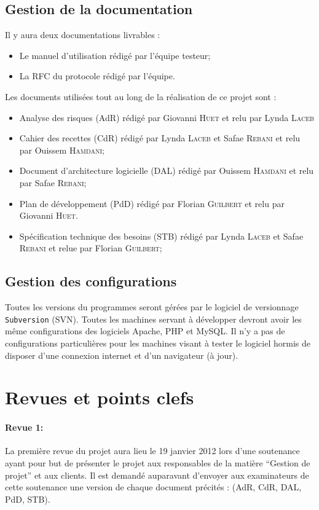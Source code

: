 \documentclass[a4paper,11pt,french]{article}
\begin{document}
\subsection{Gestion de la documentation}
Il y aura deux documentations livrables : 
\begin{itemize}
 \item Le manuel d'utilisation rédigé par l'équipe testeur;
 \item La RFC du protocole rédigé par l'équipe.
\end{itemize}
Les documents utilisées tout au long de la réalisation de ce projet sont : 
\begin{itemize}
 \item Analyse des risques (AdR) rédigé par Giovanni \textsc{Huet} et relu par
Lynda
\textsc{Laceb}
 \item Cahier des recettes (CdR) rédigé par Lynda \textsc{Laceb} et Safae
\textsc{Rebani} et relu par Ouissem \textsc{Hamdani};
 \item Document d'architecture logicielle (DAL) rédigé par Ouissem
\textsc{Hamdani} et relu par Safae \textsc{Rebani};
 \item Plan de développement (PdD) rédigé par Florian \textsc{Guilbert} et relu
par Giovanni \textsc{Huet}.
 \item Spécification technique des besoins (STB) rédigé par Lynda
\textsc{Laceb} et Safae \textsc{Rebani} et relue par Florian \textsc{Guilbert};
\end{itemize}




\subsection{Gestion des configurations}
Toutes les versions du programmes seront gérées par le logiciel de versionnage 
\texttt{Subversion} (SVN). Toutes les machines servant à développer devront
avoir les même configurations des logiciels Apache, PHP et MySQL. Il n'y a pas
de configurations particulières pour les machines visant à tester le logiciel
hormis de disposer d'une connexion internet et d'un navigateur (à jour).

\section{Revues et points clefs}
\paragraph{Revue 1:}
La première revue du projet aura lieu le 19 janvier 2012 lors d'une soutenance
ayant pour but de présenter le projet aux responsables de la matière ``Gestion
de projet'' et aux clients. Il est demandé auparavant d'envoyer aux examinateurs
de cette soutenance une version de chaque document précités : (AdR, CdR, DAL,
PdD, STB).
\end{document}
